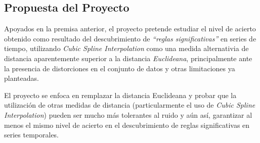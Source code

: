 \subsection{Propuesta del Proyecto}
Apoyados en la premisa anterior, el proyecto pretende estudiar el nivel de acierto obtenido como resultado del descubrimiento de \textit{\enquote{reglas significativas}} en series de tiempo, utilizando \textit{Cubic Spline Interpolation} como una medida alternativia de distancia aparentemente superior a la distancia \textit{Euclideana}, principalmente ante la presen\-cia de distorciones en el conjunto de datos y otras limitaciones ya planteadas.\par
El proyecto se enfoca en remplazar la distancia Euclideana y probar que la utilizaci\'on de otras medidas de distancia (particularmente el uso de \textit{Cubic Spline Interpolation}) pueden ser mucho m\'as tolerantes al ruido y a\'un as\'i, garantizar al menos el mismo nivel de acierto en el descubrimiento de reglas significativas en series temporales.
